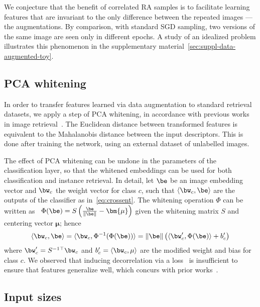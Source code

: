 We conjecture that the benefit of correlated RA samples is to facilitate learning features that are invariant to the only difference between the repeated images --- the augmentations.
By comparison, with standard SGD sampling, two versions of the same image are seen only in different epochs. 
A study of an idealized problem illustrates this phenomenon in the supplementary material~\ref{sec:suppl-data-augmented-toy}.

\subsection{PCA whitening}\label{sec:whiten}

In order to transfer features learned via data augmentation to standard retrieval datasets, we apply a step of PCA whitening, in accordance
with previous works in image retrieval~\cite{Gordo2017EndtoEndLO,jegou2012negative}.
The Euclidean distance between transformed features is equivalent to the Mahalanobis distance between the input descriptors.
This is done after training the network, using an external dataset of unlabelled images. 


The effect of PCA whitening can be undone in the parameters of the classification layer, so that the whitened embeddings can be used for both classification and instance retrieval. In detail, let $\be$ be an image embedding vector and $\bw_c$ the weight vector for class $c$, such that $\langle\bw_c,\be\rangle$ are the outputs of the classifier as in~\cref{eq:crossent}.
The whitening operation $\Phi$ can be written as~\cite{Gordo2017EndtoEndLO}
$
    \Phi(\be) = S \left(\frac{\be}{\|\be\|} - \bm{\mu}\right)
$
given the whitening matrix $S$ and centering vector $\bm{\mu}$; hence
\begin{equation*}\label{eq:adapted_classifier}
    \langle\bw_c,\be\rangle = 
    \langle\bw_c,\Phi^{-1}(\Phi(\be))\rangle =
    \|\be\| \left( \langle\bw_c', \Phi(\be)\rangle + b_c' \right) 
\end{equation*}
where 
$
\bw_c' =  
S^{-1 \top} \bw_c
$
and
$
b_c' = \langle\bw_c, \mu \rangle
$
are the modified weight and bias for class $c$.
%
We observed that inducing decorrelation via a loss~\cite{Cogswell2016ReducingOI} is insufficient to ensure that features generalize well, which concurs with prior works~\cite{Gordo2017EndtoEndLO,radenovic2018fine}.


%

%
%
%

\subsection{Input sizes\label{sec:input-size}}


